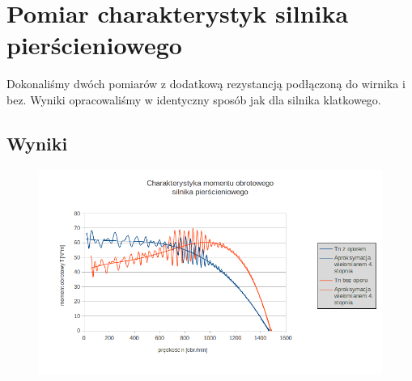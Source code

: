 \documentclass[12pt]{article}
\newcommand{\ZMa}{17}
\begin{document}
\section{Pomiar charakterystyk silnika pierścieniowego}
Dokonaliśmy dwóch pomiarów z dodatkową rezystancją podłączoną do wirnika i bez. Wyniki opracowaliśmy w identyczny sposób jak dla silnika klatkowego.
\subsection{Wyniki}
	\begin{figure}[H]
	\centering
	\includegraphics[width=\ZMa cm]{wykresy/ch_mechaniczna_pierscieniowy}
	\end{figure}
\end{document}
